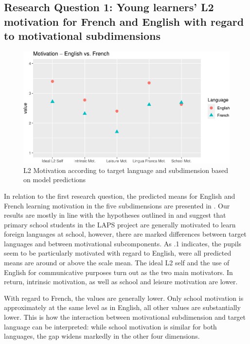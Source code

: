 \documentclass[output=paper]{langsci/langscibook}
\begin{document}
\subsection{Research Question 1: Young learners’ L2 motivation for French and English with regard to motivational subdimensions}

  
\begin{figure}
\includegraphics[width=\textwidth]{figures/Fig7.1.pdf}
\caption{L2 Motivation according to target language and subdimension based on model predictions\label{fig:07:1}}
\end{figure}

In relation to the first research question, the predicted means for English and French learning motivation in the five subdimensions are presented in . Our results are mostly in line with the hypotheses outlined in  and suggest that primary school students in the LAPS project are generally motivated to learn foreign languages at school, however, there are marked differences between target languages and between motivational subcomponents. As .1 indicates, the pupils seem to be particularly motivated with regard to English, were all predicted means are around or above the scale mean. The ideal L2 self and the use of English for communicative purposes turn out as the two main motivators. In return, intrinsic motivation, as well as school and leisure motivation are lower. 

With regard to French, the values are generally lower. Only school motivation is approximately at the same level as in English, all other values are substantially lower. This is how the interaction between motivational subdimension and target language can be interpreted: while school motivation is similar for both languages, the gap widens markedly in the other four dimensions.
\end{document}
